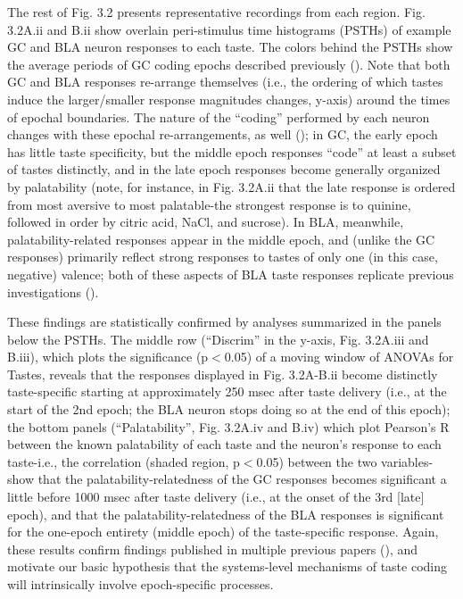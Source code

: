 \begin{refsection}
The rest of Fig. 3.2 presents representative recordings from each region. Fig. 3.2A.ii and B.ii show overlain peri-stimulus time histograms (PSTHs) of example GC and BLA neuron responses to each taste. The colors behind the PSTHs show the average periods of GC coding epochs described previously (\cite{katz2001a,fontanini2009a,sadacca2012a}). Note that both GC and BLA responses re-arrange themselves (i.e., the ordering of which tastes induce the larger/smaller response magnitudes changes, y-axis) around the times of epochal boundaries. The nature of the “coding” performed by each neuron changes with these epochal re-arrangements, as well (\cite{katz2001a,sadacca2012a,moran2014a,li2016a}); in GC, the early epoch has little taste specificity, but the middle epoch responses “code” at least a subset of tastes distinctly, and in the late epoch responses become generally organized by palatability (note, for instance, in Fig. 3.2A.ii that the late response is ordered from most aversive to most palatable-the strongest response is to quinine, followed in order by citric acid, NaCl, and sucrose). In BLA, meanwhile, palatability-related responses appear in the middle epoch, and (unlike the GC responses) primarily reflect strong responses to tastes of only one (in this case, negative) valence; both of these aspects of BLA taste responses replicate previous investigations (\cite{fontanini2009a}).

These findings are statistically confirmed by analyses summarized in the panels below the PSTHs. The middle row (“Discrim” in the y-axis, Fig. 3.2A.iii and B.iii), which plots the significance (p\(<\)0.05) of a moving window of ANOVAs for Tastes, reveals that the responses displayed in Fig. 3.2A-B.ii become distinctly taste-specific starting at approximately 250 msec after taste delivery (i.e., at the start of the 2nd epoch; the BLA neuron stops doing so at the end of this epoch); the bottom panels (“Palatability”, Fig. 3.2A.iv and B.iv) which plot Pearson’s R between the known palatability of each taste and the neuron’s response to each taste-i.e., the correlation (shaded region, p\(<\)0.05) between the two variables-show that the palatability-relatedness of the GC responses becomes significant a little before 1000 msec after taste delivery (i.e., at the onset of the 3rd [late] epoch), and that the palatability-relatedness of the BLA responses is significant for the one-epoch  entirety (middle epoch) of the taste-specific response. Again, these results confirm findings published in multiple previous papers (\cite{katz2001a,grossman2008a,fontanini2009a,sadacca2012a}), and motivate our basic hypothesis that the systems-level mechanisms of taste coding will intrinsically involve epoch-specific processes.


\end{refsection}

